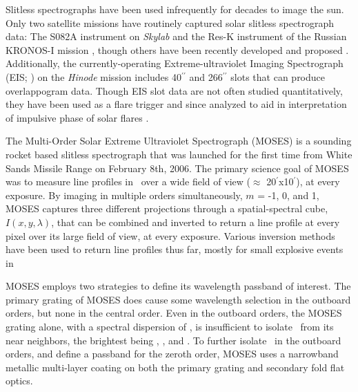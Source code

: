 	Slitless spectrographs have been used infrequently for decades to image the sun.
	Only two satellite missions have routinely captured solar slitless spectrograph data: The S082A instrument on {\it Skylab} \citep{Tousey1973} and the Res-K instrument of the Russian KRONOS-I mission \citep{Zhitnik1998}, though others have been recently developed and proposed \citep{winebarger2019,golub2020}. 
	Additionally, the currently-operating Extreme-ultraviolet Imaging Spectrograph (EIS; \citet{culhane2007}) on the {\it Hinode} mission \citep{kosugi2007} includes 40$^{\prime\prime}$ and 266$^{\prime\prime}$ slots that can produce overlappogram data.
	Though EIS slot data are not often studied quantitatively, they have been used as a flare trigger and since analyzed to aid in interpretation of impulsive phase of solar flares \citep{harra2017,harra2020}.
 
	The Multi-Order Solar Extreme Ultraviolet Spectrograph (MOSES) is a sounding rocket based slitless spectrograph that was launched for the first time from White Sands Missile Range on February 8th, 2006.
	The primary science goal of MOSES was to measure line profiles in \heii \ over a wide field of view ($\approx$ 20$^{\prime}$x10$^{\prime}$), at every exposure.
	By imaging in multiple orders simultaneously, $m$ = -1, 0, and 1, MOSES captures three different projections through a spatial-spectral cube, $I(x,y,\lambda)$, that can be combined and inverted to return a line profile at every pixel over its large field of view, at every exposure.
	Various inversion methods have been used to return line profiles thus far, mostly for small explosive events in \heii\ \citep{Fox2011,Rust2019,Courrier2018}
	
	MOSES employs two strategies to define its wavelength passband of interest.
	The primary grating of MOSES does cause some wavelength selection in the outboard orders, but none in the central order.
	Even in the outboard orders, the MOSES grating alone, with a spectral dispersion of \spectdisperspix, is insufficient to isolate \heii \ from its near neighbors, the brightest being \sixi, \fexv, and \fexvi.
	To further isolate \heii\ in the outboard orders, and define a passband for the zeroth order, MOSES uses a narrowband metallic multi-layer coating on both the primary grating and secondary fold flat optics.
		
